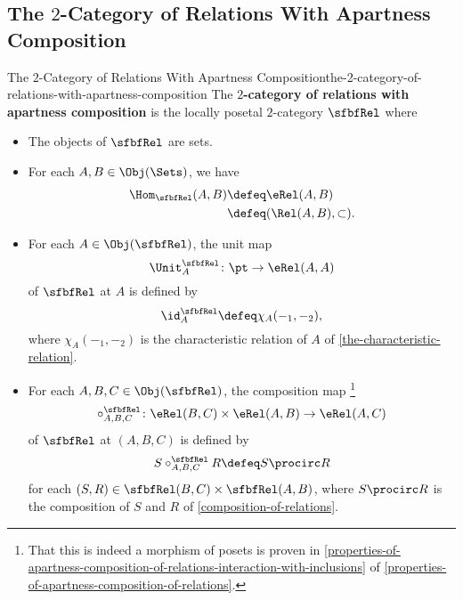 \subsection{The $2$-Category of Relations With Apartness Composition}\label{subsection-the-2-category-of-relations-with-apartness-composition}
\begin{definition}{The $2$-Category of Relations With Apartness Composition}{the-2-category-of-relations-with-apartness-composition}%
    The \textbf{$2$-category of relations with apartness composition} is the locally posetal $2$-category $\sfbfRel$ where
    \begin{itemize}
        \item{}The objects of $\sfbfRel$ are sets.
        \item{}For each $A,B\in\Obj(\Sets)$, we have
            \begin{align*}
                \Hom_{\sfbfRel}(A,B) &\defeq \eRel(A,B)\\%
                                     &\defeq (\Rel(A,B),\subset).%
            \end{align*}
        \item{}For each $A\in\Obj(\sfbfRel)$, the unit map
            \[
                \Unit^{\sfbfRel}_{A}
                \colon
                \pt
                \to
                \eRel(A,A)
            \]%
            of $\sfbfRel$ at $A$ is defined by
            \[
                \id^{\sfbfRel}_{A}
                \defeq
                \chi_{A}(-_{1},-_{2}),
            \]%
            where $\chi_{A}(-_{1},-_{2})$ is the characteristic relation of $A$ of \cref{the-characteristic-relation}.
        \item{}For each $A,B,C\in\Obj(\sfbfRel)$, the composition map%
            \footnote{%
                That this is indeed a morphism of posets is proven in \cref{properties-of-apartness-composition-of-relations-interaction-with-inclusions} of \cref{properties-of-apartness-composition-of-relations}.
                \par\vspace*{\TCBBoxCorrection}
            }%
            \[
                \circ^{\sfbfRel}_{A,B,C}%
                \colon%
                \eRel(B,C)%
                \times%
                \eRel(A,B)%
                \to%
                \eRel(A,C)%
            \]%
            of $\sfbfRel$ at $(A,B,C)$ is defined by%
            \[
                S\mathbin{{\circ}^{\sfbfRel}_{A,B,C}}R
                \defeq
                S\procirc R
            \]%
            for each $(S,R)\in\sfbfRel(B,C)\times\sfbfRel(A,B)$, where $S\procirc R$ is the composition of $S$ and $R$ of \cref{composition-of-relations}.
    \end{itemize}
\end{definition}
